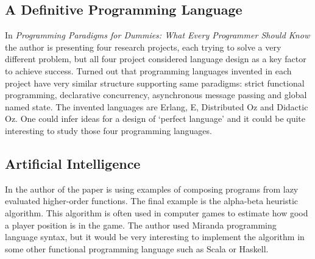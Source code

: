 \documentclass[12pt,twoside,a4paper]{report}
\begin{document}
\subsection{A Definitive Programming Language}\label{2.5.1}
In \emph{Programming Paradigms for Dummies: What Every Programmer Should Know}\cite{16} the author is presenting four research projects, each trying to solve a very different problem, but all four project considered language design as a key factor to achieve success. Turned out that programming languages invented in each project have very similar structure supporting same paradigms: strict functional programming, declarative concurrency, asynchronous message passing and global named state. The invented languages are Erlang, E, Distributed Oz and Didactic Oz. One could infer ideas for a design of ‘perfect language’ and it could be quite interesting to study those four programming languages.

\subsection{Artificial Intelligence}\label{2.5.2}
In \cite{14} the author of the paper is using examples of composing programs from lazy evaluated higher-order functions. The final example is the alpha-beta heuristic algorithm. This algorithm is often used in computer games to estimate how good a player position is in the game. The author used Miranda programming language syntax, but it would be very interesting to implement the algorithm in some other functional programming language such as Scala or Haskell.
\end{document}

